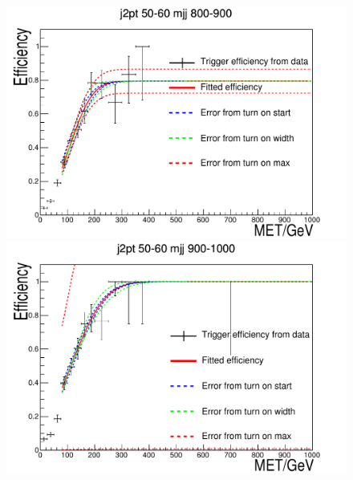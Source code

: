 \begin{figure}
  \begin{center}
    \includegraphics[width=.6\largefigwidth]{plots/parked/trigfitplots/hData_MET_1D_33BC.pdf}
    \includegraphics[width=.6\largefigwidth]{plots/parked/trigfitplots/hData_MET_1D_34BC.pdf}


\end{center}
\end{figure}
